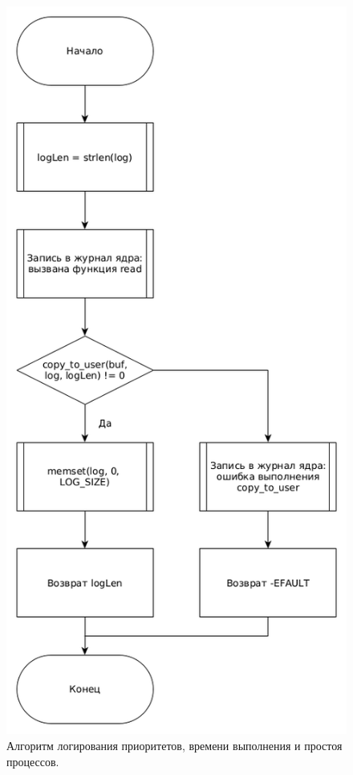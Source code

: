 \begin{figure}[H]
	\centering
	\includegraphics[scale=0.5]{img/yaRead.png}
	\caption{Алгоритм логирования приоритетов, времени выполнения и простоя процессов. }
	\label{fig:read}
\end{figure}

